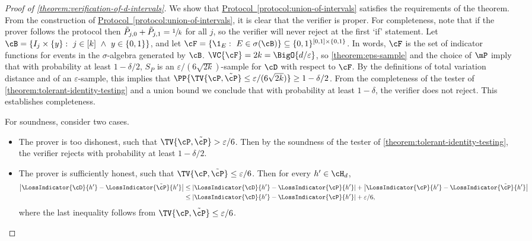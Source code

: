 \documentclass[11pt]{article}
\newcommand{\expref}[2]{\texorpdfstring{\hyperref[#2]{#1~\ref{#2}}}{#1~\ref{#2}}}
\begin{document}
\begin{proof}[Proof of \cref{theorem:verification-of-d-intervals}]
We show that \expref{Protocol}{protocol:union-of-intervals} %
	satisfies the requirements of the theorem. From the construction of \expref{Protocol}{protocol:union-of-intervals}, it is clear that the verifier is proper. For completeness, note that if the prover follows the protocol then $\tilde{P}_{j,0} + \tilde{P}_{j,1} = \sfrac{1}{k}$ for all $j$, so the verifier will never reject at the first `if' statement. Let $\cB = \{I_j \times \{y\}: ~ j \in [k] ~ \land ~ y \in \{0,1\}\}$, and let $\cF = \{\1_E: ~ E \in \sigma(\cB)\} \subseteq \{0,1\}^{[0,1]\times \{0,1\}}$. In words, $\cF$ is the set of indicator functions for events in the $\sigma$-algebra generated by $\cB$. $\VC{\cF} = 2k = \BigO{d/\varepsilon}$, so \cref{theorem:eps-sample} and the choice of $\mP$ imply that with probability at least $1-\delta/2$, $S_P$ is an $\varepsilon/(6\sqrt{2k})$-sample for $\cD$ with respect to $\cF$. By the definitions of total variation distance and of an $\varepsilon$-sample, this implies that $\PP{\TV{\cP,\tilde{\cP}} \leq \varepsilon/(6\sqrt{2k})} \geq 1-\delta/2$. From the completeness of the tester of \cref{theorem:tolerant-identity-testing} and a union bound we conclude that with probability at least $1-\delta$, the verifier does not reject. This establishes completeness.

	For soundness, consider two cases. 
	\begin{itemize}
		\item{
			The prover is too dishonest, such that $\TV{\cP,\tilde{\cP}} > \varepsilon/6$. Then by the soundness of the tester of \cref{theorem:tolerant-identity-testing}, the verifier rejects with probability at least $1-\delta/2$.
		} 
		\item{
			The prover is sufficiently honest, such that $\TV{\cP,\tilde{\cP}} \leq \varepsilon/6$. 
			Then for every $h' \in \cH_d$,
			\begin{align}
				\left|\LossIndicator{\cD}{h'} - \LossIndicator{\tilde{\cP}}{h'}\right| &\leq \left|\LossIndicator{\cD}{h'} - \LossIndicator{\cP}{h'}\right| + \left|\LossIndicator{\cP}{h'} - \LossIndicator{\tilde{\cP}}{h'}\right|  \nonumber\\
				&\leq \left|\LossIndicator{\cD}{h'} - \LossIndicator{\cP}{h'}\right| + \varepsilon/6, \label{eq:LD-vs-LPtilde}
			\end{align}
			where the last inequality follows from $\TV{\cP,\tilde{\cP}} \leq \varepsilon/6$.
		
}
\end{itemize}
\end{proof}
\end{document}
